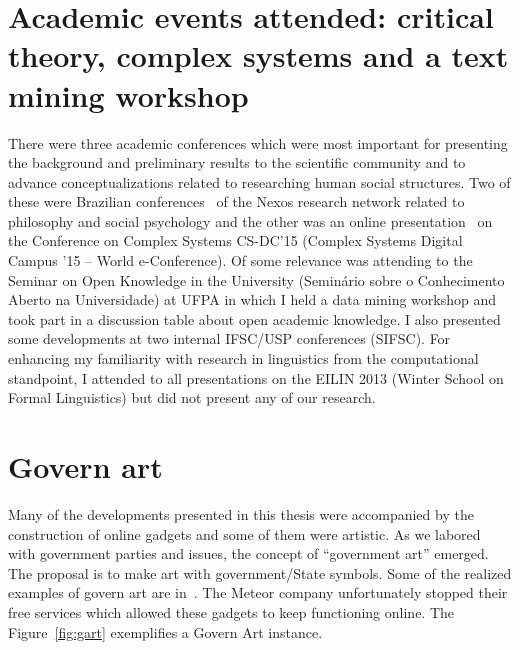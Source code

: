 \begin{apendicesenv}
\section{Academic events attended: critical theory, complex systems and a text mining workshop}\label{ap:anphy}
There were three academic conferences
which were most important for presenting the background and preliminary results to the scientific community
and to advance conceptualizations related to researching human social structures.
Two of these were Brazilian conferences~\cite{50uni,IICri} of the Nexos research network related to philosophy and social psychology
and the other was an online presentation~\cite{ccs15} on the Conference on Complex Systems CS-DC'15
(Complex Systems Digital Campus ’15 – World e-Conference).
Of some relevance was attending to the Seminar on Open Knowledge in the University
(Seminário sobre o Conhecimento Aberto na Universidade) at UFPA
in which I held a data mining workshop and took part in a discussion table about open academic knowledge.
I also presented some developments at two internal IFSC/USP conferences (SIFSC).
For enhancing my familiarity with research in linguistics from the computational standpoint,
I attended to all presentations on the EILIN 2013 (Winter School on Formal Linguistics)
but did not present any of our research.

\section{Govern art}\label{sec:govArt}
Many of the developments presented in this thesis were accompanied by the construction of online gadgets
and some of them were artistic.
As we labored with government parties and issues,
the concept of ``government art'' emerged.
The proposal is to make art with government/State symbols.
Some of the realized examples of govern art are in~\cite{aars}.
The Meteor company unfortunately stopped their free services which
allowed these gadgets to keep functioning online.
The Figure~\ref{fig:gart} exemplifies a Govern Art instance.


\end{apendicesenv}
